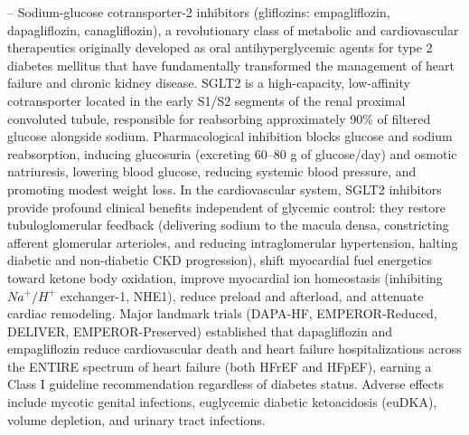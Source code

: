 -- Sodium-glucose cotransporter-2 inhibitors (gliflozins: empagliflozin, dapagliflozin, canagliflozin), a revolutionary class of metabolic and cardiovascular therapeutics originally developed as oral antihyperglycemic agents for type 2 diabetes mellitus that have fundamentally transformed the management of heart failure and chronic kidney disease. SGLT2 is a high-capacity, low-affinity cotransporter located in the early S1/S2 segments of the renal proximal convoluted tubule, responsible for reabsorbing approximately 90\% of filtered glucose alongside sodium. Pharmacological inhibition blocks glucose and sodium reabsorption, inducing glucosuria (excreting 60--80 g of glucose/day) and osmotic natriuresis, lowering blood glucose, reducing systemic blood pressure, and promoting modest weight loss. In the cardiovascular system, SGLT2 inhibitors provide profound clinical benefits independent of glycemic control: they restore tubuloglomerular feedback (delivering sodium to the macula densa, constricting afferent glomerular arterioles, and reducing intraglomerular hypertension, halting diabetic and non-diabetic CKD progression), shift myocardial fuel energetics toward ketone body oxidation, improve myocardial ion homeostasis (inhibiting $Na^+/H^+$ exchanger-1, NHE1), reduce preload and afterload, and attenuate cardiac remodeling. Major landmark trials (DAPA-HF, EMPEROR-Reduced, DELIVER, EMPEROR-Preserved) established that dapagliflozin and empagliflozin reduce cardiovascular death and heart failure hospitalizations across the ENTIRE spectrum of heart failure (both HFrEF and HFpEF), earning a Class I guideline recommendation regardless of diabetes status. Adverse effects include mycotic genital infections, euglycemic diabetic ketoacidosis (euDKA), volume depletion, and urinary tract infections.

